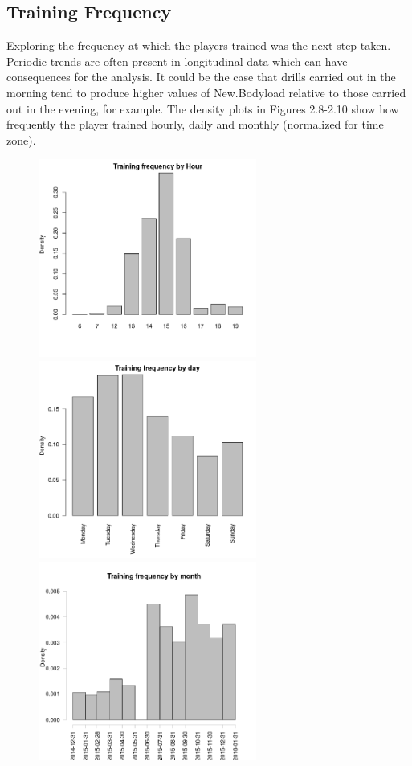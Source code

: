\subsection{Training Frequency}
Exploring the frequency at which the players trained was the next step taken. Periodic trends are often present in longitudinal data which can have consequences for the analysis. It could be the case that drills carried out in the morning tend to produce higher values of New.Bodyload relative to those carried out in the evening, for example. The density plots in Figures 2.8-2.10 show how frequently the player trained hourly, daily and monthly (normalized for time zone).\hfill\break
\begin{figure}[h]
	\centering
	\begin{minipage}{.32\textwidth}
		\centering
		\includegraphics[width=1\linewidth, height=6.5cm]{Images/TrainingByHour.png}
		\caption{}
	\end{minipage} %
	\begin{minipage}{.32\textwidth}
		\centering
		\includegraphics[width=1\linewidth, height=6.5cm]{Images/TrainingFreqDay.png}
		\caption{}
	\end{minipage} %
	\begin{minipage}{.32\textwidth}
		\centering
		\includegraphics[width=1\linewidth, height=6.5cm]{Images/MonthlyDrills.png}

\end{minipage}
\end{figure}
